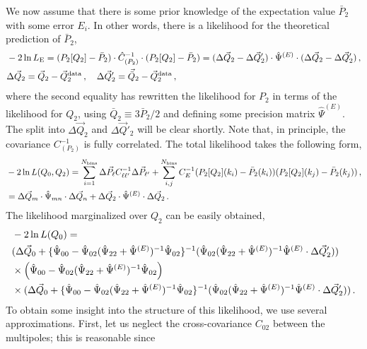 \documentclass[12pt,a4paper]{article}
\newcommand{\be}{\begin{equation}}
\newcommand{\ee}{\end{equation}}
\renewcommand{\ln}{\mathop{\rm ln}\nolimits}
\begin{document}
We now assume that there is some 
 prior knowledge of the expectation value $\bar P_{2}$ with some error $E_i$. 
 In other words, there is a likelihood for the 
 theoretical prediction of $\bar P_{2}$, 
 \be
 \begin{split}
 &-2\ln L_{\rm E} = (P_2[Q_2]- \bar P_{2})\cdot \hat{C}_{(P_2)}^{-1} \cdot (P_2[Q_2]- \bar P_{2})= 
(\Delta \vec{Q}_2 - \Delta \vec{Q}'_2)\cdot \hat{\Psi}^{(E)} \cdot  (\Delta \vec{Q}_2 - \Delta \vec{Q}'_2) \,,\\
 & \Delta \vec{Q}_2=\vec{Q}_2- \vec{Q}^{\rm data}_{2}\,,\quad 
 \Delta \vec{Q}'_2=\vec{\bar{Q}}_{2}-\vec{Q}^{\rm data}_2\,,
 \end{split}
 \ee
 where the second equality has rewritten the likelihood for $P_2$
 in terms of the likelihood for $Q_{2}$, using 
 $\bar Q_{2}\equiv 3\bar{P}_2/2$ and defining some precision matrix $\hat{\Psi}^{(E)}$. 
 The split into $\Delta \vec{Q}_2$ and $\Delta \vec{Q}'_2$
 will be clear shortly.
Note that, in principle, the covariance $C_{(P_2)}^{-1}$ is fully correlated. 
The total likelihood takes the following
 form,
\be 
\begin{split}
& -2\ln L(Q_0,Q_2)  = \sum_{i=1}^{N_{\rm bins}} \Delta \vec{P_{\ell}}  C_{\ell \ell'}^{-1}
\Delta \vec{P}_{\ell'}+ \sum_{i,j}^{N_{\rm bins}} C^{-1}_E (P_2[Q_2](k_i) - \bar P_{2}(k_i)) (P_2[Q_2](k_j) - \bar P_{2}(k_j)) \,,\\
&=\Delta \vec{Q}_{m} \cdot \hat{\Psi}_{mn}\cdot \Delta \vec{Q}_{n}
+
\Delta \vec{Q}_2
\cdot \hat{\Psi}^{(E)}\cdot 
\Delta \vec{Q}_2\,.
\end{split}
\ee
The likelihood marginalized over $Q_2$ can be easily obtained, 
\be
\begin{split}
& -2\ln L(Q_0)  = \\
& (\Delta \vec{Q}_0 + 
\{\hat{\Psi}_{00} -\hat{\Psi}_{02}(\hat{\Psi}_{22}+\hat{\Psi}^{(E)})^{-1}\hat{\Psi}_{02}\}^{-1}
(\hat{\Psi}_{02} (\hat{\Psi}_{22}+\hat{\Psi}^{(E)})^{-1} \hat{\Psi}^{(E)}\cdot \Delta \vec{Q}'_2)) \\
& \times 
\left(\hat{\Psi}_{00} -\hat{\Psi}_{02}(\hat{\Psi}_{22}+\hat{\Psi}^{(E)})^{-1}\hat{\Psi}_{02}\right)\\
&\times (\Delta \vec{Q}_0 + 
\{\hat{\Psi}_{00} -\hat{\Psi}_{02}(\hat{\Psi}_{22}+\hat{\Psi}^{(E)})^{-1}\hat{\Psi}_{02}\}^{-1}
(\hat{\Psi}_{02} (\hat{\Psi}_{22}+\hat{\Psi}^{(E)})^{-1} \hat{\Psi}^{(E)}\cdot \Delta \vec{Q}'_2))\,.
\end{split}
\ee
To obtain some insight into the structure of this likelihood, we use several approximations. 
First, let us neglect the cross-covariance $C_{02}$ between the multipoles; this is reasonable since
\end{document}
